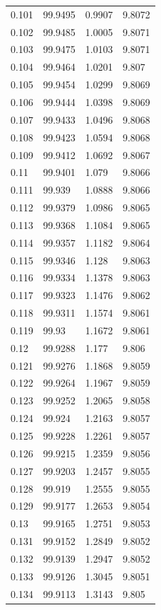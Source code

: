\begin{tabular}{llll}
0.101 & 99.9495 & 0.9907 & 9.8072 \\
0.102 & 99.9485 & 1.0005 & 9.8071 \\
0.103 & 99.9475 & 1.0103 & 9.8071 \\
0.104 & 99.9464 & 1.0201 & 9.807 \\
0.105 & 99.9454 & 1.0299 & 9.8069 \\
0.106 & 99.9444 & 1.0398 & 9.8069 \\
0.107 & 99.9433 & 1.0496 & 9.8068 \\
0.108 & 99.9423 & 1.0594 & 9.8068 \\
0.109 & 99.9412 & 1.0692 & 9.8067 \\
0.11 & 99.9401 & 1.079 & 9.8066 \\
0.111 & 99.939 & 1.0888 & 9.8066 \\
0.112 & 99.9379 & 1.0986 & 9.8065 \\
0.113 & 99.9368 & 1.1084 & 9.8065 \\
0.114 & 99.9357 & 1.1182 & 9.8064 \\
0.115 & 99.9346 & 1.128 & 9.8063 \\
0.116 & 99.9334 & 1.1378 & 9.8063 \\
0.117 & 99.9323 & 1.1476 & 9.8062 \\
0.118 & 99.9311 & 1.1574 & 9.8061 \\
0.119 & 99.93 & 1.1672 & 9.8061 \\
0.12 & 99.9288 & 1.177 & 9.806 \\
0.121 & 99.9276 & 1.1868 & 9.8059 \\
0.122 & 99.9264 & 1.1967 & 9.8059 \\
0.123 & 99.9252 & 1.2065 & 9.8058 \\
0.124 & 99.924 & 1.2163 & 9.8057 \\
0.125 & 99.9228 & 1.2261 & 9.8057 \\
0.126 & 99.9215 & 1.2359 & 9.8056 \\
0.127 & 99.9203 & 1.2457 & 9.8055 \\
0.128 & 99.919 & 1.2555 & 9.8055 \\
0.129 & 99.9177 & 1.2653 & 9.8054 \\
0.13 & 99.9165 & 1.2751 & 9.8053 \\
0.131 & 99.9152 & 1.2849 & 9.8052 \\
0.132 & 99.9139 & 1.2947 & 9.8052 \\
0.133 & 99.9126 & 1.3045 & 9.8051 \\
0.134 & 99.9113 & 1.3143 & 9.805 \\

\end{tabular}
